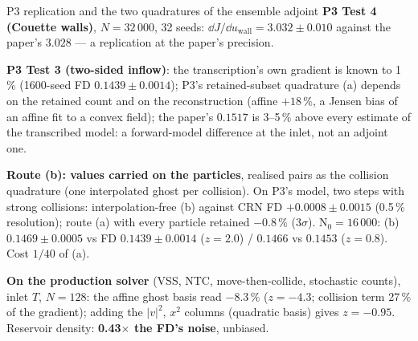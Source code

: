 \documentclass[10pt,aspectratio=169]{beamer}
\begin{document}
\begin{frame}{P3 replication and the two quadratures of the ensemble adjoint}
\footnotesize
\textbf{P3 Test 4 (Couette walls)}, $N = 32\,000$, 32 seeds: $\dd J/\dd u_{\mathrm{wall}} =
3.032\pm0.010$ against the paper's $3.028$ --- a replication at the paper's precision.

\textbf{P3 Test 3 (two-sided inflow)}: the transcription's own gradient is known to 1\,\%
(1600-seed FD $0.1439\pm0.0014$); P3's retained-subset quadrature (a) depends on the retained count
and on the reconstruction (affine $+18\,\%$, a Jensen bias of an affine fit to a convex field);
the paper's $0.1517$ is 3--5\,\% above every estimate of the transcribed model: a forward-model
difference at the inlet, not an adjoint one.

\textbf{Route (b): values carried on the particles}, realised pairs as the collision quadrature
(one interpolated ghost per collision).  On P3's model, two steps with strong collisions:
interpolation-free (b) against CRN FD $+0.0008\pm0.0015$ (0.5\,\% resolution); route (a) with
every particle retained $-0.8\,\%$ ($3\sigma$).  N$_0 = 16\,000$: (b) $0.1469\pm0.0005$ vs FD
$0.1439\pm0.0014$ ($z = 2.0$) / $0.1466$ vs $0.1453$ ($z = 0.8$).  Cost $1/40$ of (a).

\medskip
\textbf{On the production solver} (VSS, NTC, move-then-collide, stochastic counts), inlet
$T$, $N = 128$: the affine ghost basis read $-8.3\,\%$ ($z = -4.3$; collision term 27\,\% of the
gradient); adding the $|v|^2$, $x^2$ columns (quadratic basis) gives $z = -0.95$.  Reservoir density:
\textbf{0.43$\times$ the FD's noise}, unbiased.
\end{frame}
\end{document}
